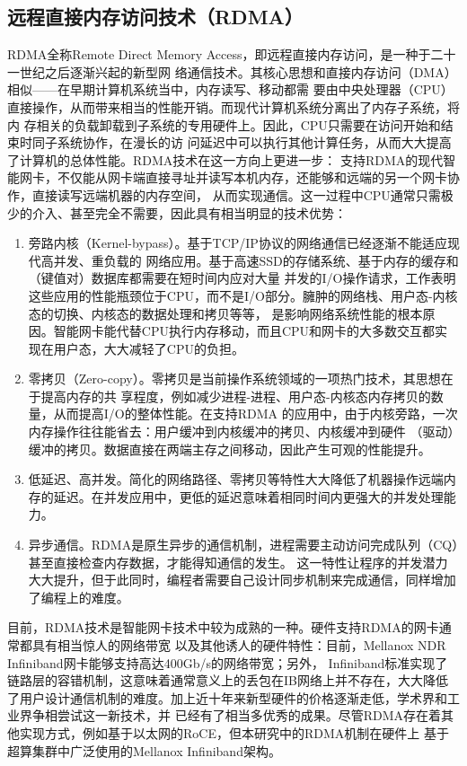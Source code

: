 \subsection{远程直接内存访问技术（RDMA）}

RDMA全称Remote Direct Memory Access，即远程直接内存访问，是一种于二十一世纪之后逐渐兴起的新型网
络通信技术。其核心思想和直接内存访问（DMA）相似——在早期计算机系统当中，内存读写、移动都需
要由中央处理器（CPU）直接操作，从而带来相当的性能开销。而现代计算机系统分离出了内存子系统，将内
存相关的负载卸载到子系统的专用硬件上。因此，CPU只需要在访问开始和结束时同子系统协作，在漫长的访
问延迟中可以执行其他计算任务，从而大大提高了计算机的总体性能。RDMA技术在这一方向上更进一步：
支持RDMA的现代智能网卡，不仅能从网卡端直接寻址并读写本机内存，还能够和远端的另一个网卡协作，直接读写远端机器的内存空间，
从而实现通信。这一过程中CPU通常只需极少的介入、甚至完全不需要，因此具有相当明显的技术优势：

\begin{enumerate}
	\item 旁路内核（Kernel-bypass）。基于TCP/IP协议的网络通信已经逐渐不能适应现代高并发、重负载的
	网络应用。基于高速SSD的存储系统、基于内存的缓存和（键值对）数据库都需要在短时间内应对大量
	并发的I/O操作请求，工作\cite{mitchell2013using}表明这些应用的性能瓶颈位于CPU，而不是I/O部分。臃肿的网络栈、用户态-内核态的切换、内核态的数据处理和拷贝等等，
	是影响网络系统性能的根本原因。智能网卡能代替CPU执行内存移动，而且CPU和网卡的大多数交互都实现在用户态，大大减轻了CPU的负担。
	\item 零拷贝（Zero-copy）。零拷贝是当前操作系统领域的一项热门技术\cite{taranov2021naos}\cite{chapman2010introducing}，其思想在于提高内存的共
	享程度，例如减少进程-进程、用户态-内核态内存拷贝的数量，从而提高I/O的整体性能。在支持RDMA
	的应用中，由于内核旁路，一次内存操作往往能省去：用户缓冲到内核缓冲的拷贝、内核缓冲到硬件
	（驱动）缓冲的拷贝。数据直接在两端主存之间移动，因此产生可观的性能提升\cite{taranov2021naos}。
	\item 低延迟、高并发。简化的网络路径、零拷贝等特性大大降低了机器操作远端内存的延迟\cite{neugebauer2018understanding}。在并发应用中，更低的延迟意味着相同时间内更强大的并发处理能力。
	\item 异步通信。RDMA是原生异步的通信机制，进程需要主动访问完成队列（CQ）甚至直接检查内存数据，才能得知通信的发生。
	这一特性让程序的并发潜力大大提升，但于此同时，编程者需要自己设计同步机制来完成通信，同样增加了编程上的难度。
\end{enumerate}

目前，RDMA技术是智能网卡技术中较为成熟的一种。硬件支持RDMA的网卡通常都具有相当惊人的网络带宽
以及其他诱人的硬件特性：目前，Mellanox NDR Infiniband网卡能够支持高达400Gb/s的网络带宽；另外，
Infiniband标准实现了链路层的容错机制，这意味着通常意义上的丢包在IB网络上并不存在，大大降低
了用户设计通信机制的难度。加上近十年来新型硬件的价格逐渐走低\cite{mitchell2013using}，学术界和工业界争相尝试这一新技术，并
已经有了相当多优秀的成果。尽管RDMA存在着其他实现方式，例如基于以太网的RoCE，但本研究中的RDMA机制在硬件上
基于超算集群中广泛使用的Mellanox Infiniband架构。

